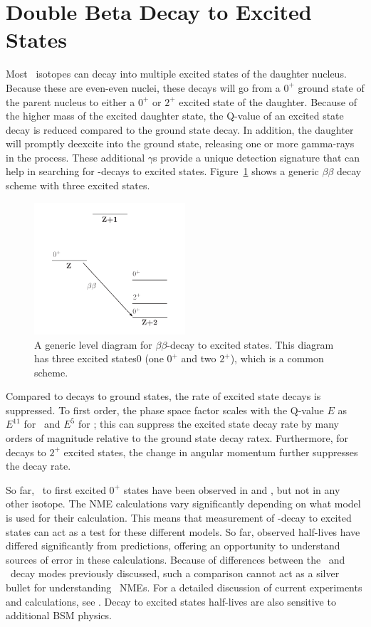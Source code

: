 \documentclass[/main.tex]{subfiles}
\begin{document}
\section{Double Beta Decay to Excited States} \label{sec:bbestheory}
Most \bb\ isotopes can decay into multiple excited states of the daughter nucleus.
Because these are even-even nuclei, these decays will go from a $0^+$ ground state of the parent nucleus to either a $0^+$ or $2^+$ excited state of the daughter.
Because of the higher mass of the excited daughter state, the Q-value of an excited state decay is reduced compared to the ground state decay.
In addition, the daughter will promptly deexcite into the ground state, releasing one or more gamma-rays in the process.
These additional $\gamma$s provide a unique detection signature that can help in searching for \bb-decays to excited states.
Figure~\ref{fig:bbeslevelgeneric} shows a generic $\beta\beta$ decay scheme with three excited states.
\begin{figure}[t]
  \centering
  \includegraphics[width=0.5\textwidth]{bbesdecayscheme}
  \caption[Generic $\beta\beta$ to Excited States Level Diagram]{\label{fig:bbeslevelgeneric}
    A generic level diagram for $\beta\beta$-decay to excited states. This diagram has three excited states0 (one $0^+$ and two $2^+$), which is a common scheme.
  }
\end{figure}

Compared to decays to ground states, the rate of excited state decays is suppressed.
To first order, the phase space factor scales with the Q-value $E$ as $E^{11}$ for \tnbb\ and $E^5$ for \znbb; this can suppress the excited state decay rate by many orders of magnitude relative to the ground state decay ratex.
Furthermore, for decays to $2^+$ excited states, the change in angular momentum further suppresses the decay rate.

So far, \tnbb\ to first excited $0^+$ states have been observed in  and , but not in any other isotope.
The NME calculations vary significantly depending on what model is used for their calculation.
This means that measurement of \bb -decay to excited states can act as a test for these different models.
So far, observed half-lives have differed significantly from predictions, offering an opportunity to understand sources of error in these calculations.
Because of differences between the \tnbb\ and \znbb\ decay modes previously discussed, such a comparison cannot act as a silver bullet for understanding \znbb\ NMEs.
For a detailed discussion of current experiments and calculations, see \cite{barabash2017}.
Decay to excited states half-lives are also sensitive to additional BSM physics.
\end{document}
